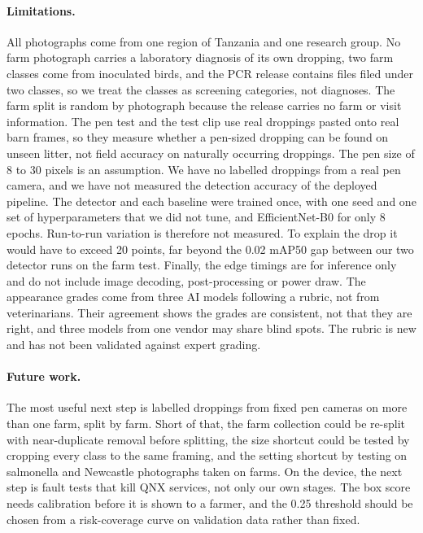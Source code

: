 \documentclass[10pt,twocolumn]{article}
\begin{document}
\paragraph{Limitations.} All photographs come from one region of Tanzania and one research group. No farm photograph
carries a laboratory diagnosis of its own dropping, two farm classes come from inoculated birds, and the PCR release
contains files filed under two classes, so we treat the classes as screening categories, not diagnoses. The farm
split is random by photograph because the release carries no farm or visit information. The pen test and the test
clip use real droppings pasted onto real barn frames, so they measure whether a pen-sized dropping can be found on
unseen litter, not field accuracy on naturally occurring droppings. The pen size of 8 to 30 pixels is an assumption.
We have no labelled droppings from a real pen camera, and we have not measured the detection accuracy of the deployed
pipeline. The detector and each baseline were trained once, with one seed and one set of hyperparameters that we did
not tune, and EfficientNet-B0 for only 8 epochs. Run-to-run variation is therefore not measured. To explain the drop it
would have to exceed 20 points, far beyond the 0.02 mAP50 gap between our two detector runs on the farm test.
Finally, the edge timings are for inference only and do not include image decoding, post-processing or power draw.
The appearance grades come from three AI models following a rubric, not from veterinarians. Their agreement shows
the grades are consistent, not that they are right, and three models from one vendor may share blind spots. The
rubric is new and has not been validated against expert grading.

\paragraph{Future work.} The most useful next step is labelled droppings from fixed pen cameras on more than one
farm, split by farm. Short of that, the farm collection could be re-split with near-duplicate removal before
splitting, the size shortcut could be tested by cropping every class to the same framing, and the setting shortcut by
testing on salmonella and Newcastle photographs taken on farms. On the device, the next step is fault tests that kill QNX services, not only our own stages. The box score needs
calibration before it is shown to a farmer, and the 0.25 threshold should be chosen from a risk-coverage curve on
validation data rather than fixed.
\end{document}

